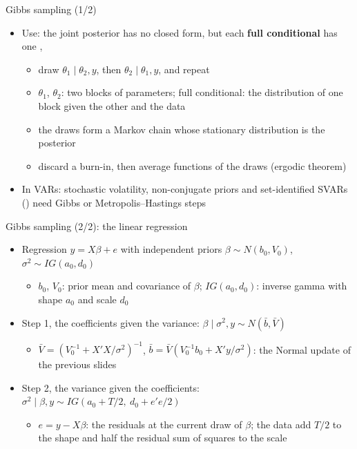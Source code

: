 \begin{frame}{Gibbs sampling (1/2)}
\itemsize{\small}
\begin{itemize}
    \item Use: the joint posterior has no closed form, but each \textbf{full conditional} has one , 
    \begin{itemize}
        \item draw $\theta_1\mid\theta_2, y$, then $\theta_2\mid\theta_1, y$, and repeat
        \item $\theta_1$, $\theta_2$: two blocks of parameters; full conditional: the distribution of one block given the other and the data
        \item the draws form a Markov chain whose stationary distribution is the posterior
        \item discard a burn-in, then average functions of the draws (ergodic theorem)
    \end{itemize}
    \item In VARs: stochastic volatility, non-conjugate priors and set-identified SVARs () need Gibbs or Metropolis--Hastings steps
\end{itemize}
\end{frame}

\begin{frame}{Gibbs sampling (2/2): the linear regression}
\itemsize{\small}
\begin{itemize}
    \item Regression $y = X\beta + e$ with independent priors $\beta \sim N(b_0, V_0)$, $\sigma^2 \sim IG(a_0, d_0)$
    \begin{itemize}
        \item $b_0$, $V_0$: prior mean and covariance of $\beta$; $IG(a_0, d_0)$: inverse gamma with shape $a_0$ and scale $d_0$
    \end{itemize}
    \item Step 1, the coefficients given the variance: $\beta\mid\sigma^2, y \sim N(\bar b, \bar V)$
    \begin{itemize}
        \item $\bar V = (V_0^{-1} + X'X/\sigma^2)^{-1}$, $\bar b = \bar V(V_0^{-1}b_0 + X'y/\sigma^2)$: the Normal update of the previous slides
    \end{itemize}
    \item Step 2, the variance given the coefficients: $\sigma^2\mid\beta, y \sim IG(a_0 + T/2,\ d_0 + e'e/2)$
    \begin{itemize}
        \item $e = y - X\beta$: the residuals at the current draw of $\beta$; the data add $T/2$ to the shape and half the residual sum of squares to the scale
    \end{itemize}
\end{itemize}
\end{frame}

